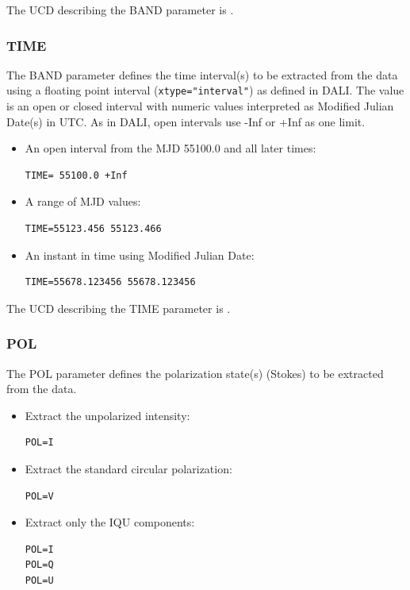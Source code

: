 \documentclass[11pt,a4paper]{ivoa}
\begin{document}
The UCD describing the BAND parameter is .


\subsubsection{TIME}
\label{sec:TIME}

The BAND parameter defines the time interval(s) to be extracted from the
data using a floating point interval (\verb|xtype="interval"|) as
defined in DALI.  The value is an open or closed
interval with numeric values interpreted as Modified Julian Date(s) in
UTC. As in DALI, open intervals use -Inf or +Inf as one limit.

\begin{itemize}
\item An open interval from the MJD 55100.0 and all later times:

\begin{lstlisting}
TIME= 55100.0 +Inf
\end{lstlisting}

\item A range of MJD values:

\begin{lstlisting}
TIME=55123.456 55123.466
\end{lstlisting}

\item An instant in time using Modified Julian Date:

\begin{lstlisting}
TIME=55678.123456 55678.123456
\end{lstlisting}
\end{itemize}

The UCD describing the TIME parameter is
.


\subsubsection{POL}
\label{sec:POL}

The POL parameter defines the polarization state(s) (Stokes)
to be extracted from the data.

\begin{itemize}
\item Extract the unpolarized intensity:
\begin{lstlisting}
POL=I
\end{lstlisting}
\item Extract the standard circular polarization:
\begin{lstlisting}
POL=V
\end{lstlisting}

\item Extract only the IQU components:
\begin{lstlisting}
POL=I
POL=Q
POL=U
\end{lstlisting}
\end{itemize}
\end{document}

